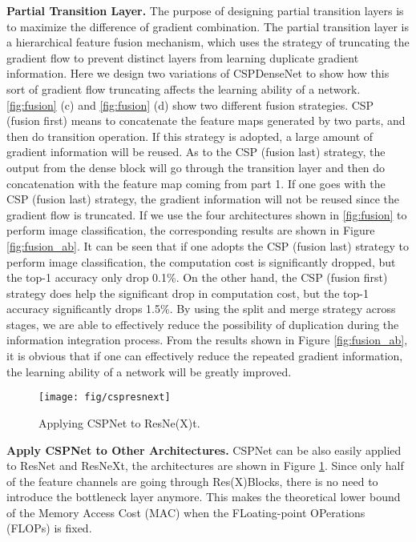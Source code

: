 \documentclass{article}
\begin{document}
{\bf Partial Transition Layer.} The purpose of designing partial transition layers is to maximize the difference of gradient combination.  The partial transition layer is a hierarchical feature fusion mechanism, which uses the strategy of truncating the gradient flow to prevent distinct layers from learning duplicate gradient information.  Here we design two variations of CSPDenseNet to show how this sort of gradient flow truncating affects the learning ability of a network.  \ref{fig:fusion} (c) and \ref{fig:fusion} (d) show two different fusion strategies.  CSP (fusion first) means to concatenate the feature maps generated by two parts, and then do transition operation.  If this strategy is adopted, a large amount of gradient information will be reused.  As to the CSP (fusion last) strategy, the output from the dense block will go through the transition layer and then do concatenation with the feature map coming from part 1.  If one goes with the CSP (fusion last) strategy, the gradient information will not be reused since the gradient flow is truncated.  If we use the four architectures shown in \ref{fig:fusion} to perform image classification, the corresponding results are shown in Figure \ref{fig:fusion_ab}.  It can be seen that if one adopts the CSP (fusion last) strategy to perform image classification, the computation cost is significantly dropped, but the top-1 accuracy only drop 0.1\%.  On the other hand, the CSP (fusion first) strategy does help the significant drop in computation cost, but the top-1 accuracy significantly drops 1.5\%.  By using the split and merge strategy across stages, we are able to effectively reduce the possibility of duplication during the information integration process.  From the results shown in Figure \ref{fig:fusion_ab}, it is obvious that if one can effectively reduce the repeated gradient information, the learning ability of a network will be greatly improved.

\begin{figure}[h]
	\begin{center}
		\texttt{[image: fig/cspresnext]}
	\end{center}
	\caption{Applying CSPNet to ResNe(X)t.  }
	\label{fig:cspresnext}
\end{figure}

{\bf Apply CSPNet to Other Architectures.} CSPNet can be also easily applied to ResNet and ResNeXt, the architectures are shown in Figure \ref{fig:cspresnext}.  Since only half of the feature channels are going through Res(X)Blocks, there is no need to introduce the bottleneck layer anymore.  This makes the theoretical lower bound of the Memory Access Cost (MAC) when the FLoating-point OPerations (FLOPs) is fixed.
\end{document}

